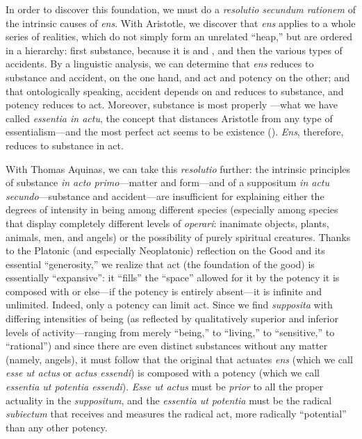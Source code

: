 In order to discover this foundation, we must do a \emph{resolutio secundum rationem} of the intrinsic causes of \emph{ens}. With Aristotle, we discover that \emph{ens} applies to a whole series of realities, which do not simply form an unrelated ``heap,'' but are ordered in a hierarchy: first substance, because it is  and , and then the various types of accidents. By a linguistic analysis, we can determine that \emph{ens} reduces to substance and accident, on the one hand, and act and potency on the other; and that ontologically speaking, accident depends on and reduces to substance, and potency reduces to act. Moreover, substance is most properly ---what we have called \emph{essentia in actu}, the concept that distances Aristotle from any type of essentialism---and the most perfect act seems to be existence (). \emph{Ens}, therefore, reduces to substance in act.

With Thomas Aquinas, we can take this \emph{resolutio} further: the intrinsic principles of substance \emph{in acto primo}---matter and form---and of a suppositum \emph{in actu secundo}---substance and accident---are insufficient for explaining either the degrees of intensity in being among different species (especially among species that display completely different levels of \emph{operari}: inanimate objects, plants, animals, men, and angels) or the possibility of purely spiritual creatures.
Thanks to the Platonic (and especially Neoplatonic) reflection on the Good and its essential ``generosity,'' we realize that act (the foundation of the good) is essentially ``expansive'': it ``fills'' the ``space'' allowed for it by the potency it is composed with or else---if the potency is entirely absent---it is infinite and unlimited. Indeed, only a potency can limit act. Since we find \emph{supposita} with differing intensities of being (as reflected by qualitatively superior and inferior levels of activity---ranging from merely ``being,'' to ``living,'' to ``sensitive,'' to ``rational'') and since the\emph{}re are even distinct substances without any matter (namely, angels), it must follow that the original  that actuates \emph{ens} (which we call \emph{esse ut actus} or \emph{actus essendi}) is composed with a potency (which we call \emph{essentia ut potentia essendi}). \emph{Esse ut actus} must be \emph{prior} to all the proper actuality in the \emph{suppositum}, and the \emph{essentia ut potentia} must be the radical \emph{subiectum} that receives and measures the radical act, more radically ``potential'' than any other potency.

